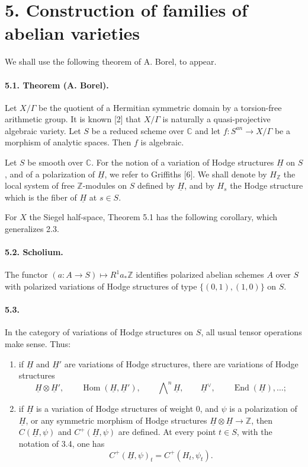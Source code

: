 \documentclass[10pt]{article}
\newcommand{\C}{\mathbb{C}}
\newcommand{\Z}{\mathbb{Z}}
\newcommand{\End}{\operatorname{End}}
\newcommand{\Hom}{\operatorname{Hom}}
\begin{document}
\section*{5. Construction of families of abelian varieties}

We shall use the following theorem of A. Borel, to appear.

\paragraph{5.1. Theorem (A. Borel).} Let $X/\Gamma$ be the quotient of a Hermitian symmetric domain by a torsion-free arithmetic group. It is known [2] that $X/\Gamma$ is naturally a quasi-projective algebraic variety. Let $S$ be a reduced scheme over $\C$ and let $f:S^{an}\to X/\Gamma$ be a morphism of analytic spaces. Then $f$ is algebraic.

Let $S$ be smooth over $\C$. For the notion of a variation of Hodge structures $\underline H$ on $S$, and of a polarization of $\underline H$, we refer to Griffiths [6]. We shall denote by $H_\Z$ the local system of free $\Z$-modules on $S$ defined by $\underline H$, and by $H_s$ the Hodge structure which is the fiber of $\underline H$ at $s\in S$.

For $X$ the Siegel half-space, Theorem 5.1 has the following corollary, which generalizes 2.3.

\paragraph{5.2. Scholium.} The functor $(a:A\to S)\mapsto R^1a_*\Z$ identifies polarized abelian schemes $A$ over $S$ with polarized variations of Hodge structures of type $\{(0,1),(1,0)\}$ on $S$.

\paragraph{5.3.} In the category of variations of Hodge structures on $S$, all usual tensor operations make sense. Thus:
\begin{enumerate}[label=\alph*)]
\item if $\underline H$ and $\underline H'$ are variations of Hodge structures, there are variations of Hodge structures
\[
\underline H\otimes\underline H',\qquad
\Hom(\underline H,\underline H'),\qquad
\bigwedge\nolimits^n\underline H,\qquad
\underline H^\vee,\qquad
\End(\underline H),\ldots;
\]
\item if $\underline H$ is a variation of Hodge structures of weight $0$, and $\psi$ is a polarization of $\underline H$, or any symmetric morphism of Hodge structures $\underline H\otimes\underline H\to\Z$, then $C(\underline H,\psi)$ and $C^+(\underline H,\psi)$ are defined. At every point $t\in S$, with the notation of 3.4, one has
\[
C^+(\underline H,\psi)_t=C^+(H_t,\psi_t).
\]
\end{enumerate}
\end{document}
